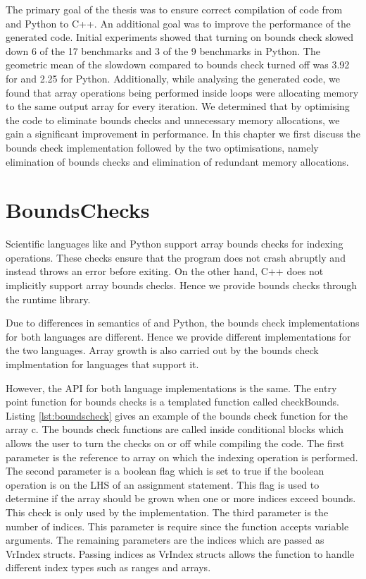 The primary goal of the thesis was to ensure correct compilation of code from \matlab and Python to C++. An additional goal was to improve the performance of the generated code. Initial experiments showed that turning on bounds check slowed down 6 of the 17 benchmarks and 3 of the 9 benchmarks in Python. The geometric mean of the slowdown compared to bounds check turned off was 3.92 for \matlab and 2.25 for Python. Additionally, while analysing the generated code, we found that array operations being performed inside loops were allocating memory to the same output array for every iteration. We determined that by optimising the code to eliminate bounds checks and unnecessary memory allocations, we gain a significant improvement in performance. In this chapter we first discuss the bounds check implementation followed by the two optimisations, namely elimination of bounds checks and elimination of redundant memory allocations. 
\section{BoundsChecks}
Scientific languages like \matlab and Python support array bounds checks for indexing operations. These checks ensure that the program does not crash abruptly and instead throws an error before exiting. On the other hand, C++ does not implicitly support array bounds checks. Hence we provide bounds checks through the runtime library.

Due to differences in semantics of \matlab and Python, the bounds check implementations for both languages are different. Hence we provide different implementations for the two languages. Array growth is also carried out by the bounds check implmentation for languages that support it. 

However, the API for both language implementations is the same. The entry point function for bounds checks is a templated function called checkBounds. Listing \ref{lst:boundscheck} gives an example of the bounds check function for the array c. The bounds check functions are called inside conditional blocks which allows the user to turn the checks on or off while compiling the code. The first parameter is the reference to array on which the indexing operation is performed. The second parameter is a boolean flag which is set to true if the boolean operation is on the LHS of an assignment statement. This flag is used to determine if the array should be grown when one or more indices exceed bounds. This check is only used by the \matlab implementation. The third parameter is the number of indices. This parameter is require since the function accepts variable arguments. The remaining parameters are the indices which are passed as VrIndex structs. Passing indices as VrIndex structs allows the function to handle different index types such as ranges and arrays.

